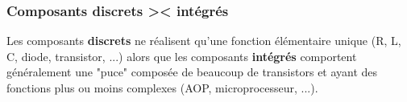 \subsubsection{Composants discrets >< intégrés}
Les composants \textbf{discrets} ne réalisent qu'une fonction élémentaire unique (R, L, C, diode, transistor, ...) alors que les composants \textbf{intégrés} comportent généralement une "puce" composée de beaucoup de transistors et ayant des fonctions plus ou moins complexes (AOP, microprocesseur, ...).